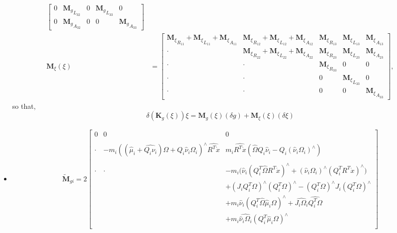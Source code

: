 \documentclass[10pt]{article}
\begin{document}
\begin{itemize}
\begin{align*}
\begin{bmatrix}
	0 & {\mathbf{M}_g}_{L_{32}} & 0 & {\mathbf{M}_g}_{L_{33}} & 0 \\
	0 & {\mathbf{M}_g}_{A_{32}} & 0 & 0 & {\mathbf{M}_g}_{A_{33}}
	\end{bmatrix}
	\\
	{\mathbf{M}_\xi}(\xi) &= \begin{bmatrix}
	{\mathbf{M}_\xi}_{R_{11}} + {\mathbf{M}_\xi}_{L_{11}} + {\mathbf{M}_\xi}_{A_{11}}
	& {\mathbf{M}_\xi}_{R_{12 }} + {\mathbf{M}_\xi}_{L_{12}} + {\mathbf{M}_\xi}_{A_{12}}
	& {\mathbf{M}_\xi}_{R_{13 }}
	& {\mathbf{M}_\xi}_{L_{13}} 
	& {\mathbf{M}_\xi}_{A_{13}} \\
	\cdot & {\mathbf{M}_\xi}_{R_{22}} + {\mathbf{M}_\xi}_{L_{22}} + {\mathbf{M}_\xi}_{A_{22}}
	& {\mathbf{M}_\xi}_{R_{23}} 
	& {\mathbf{M}_\xi}_{L_{23}} 
	& {\mathbf{M}_\xi}_{A_{23}} \\
	\cdot & \cdot &  {\mathbf{M}_\xi}_{R_{33}}
	& 0 & 0 \\
	\cdot & \cdot & 0
	& {\mathbf{M}_\xi}_{L_{33}} & 0 \\
	\cdot & \cdot & 0 & 0 & {\mathbf{M}_\xi}_{A_{33}}
	\end{bmatrix},
	\end{align*}
	so that,
	\begin{equation*}
	\delta (\mathbf{K}_g(\xi)) \xi = \mathbf{M}_g(\xi) (\delta g) + \mathbf{M}_\xi (\xi) (\delta \xi)
	\end{equation*}
	\item \begin{align*}
	\tilde{\mathbf{M}}_{gi} = 2 \begin{bmatrix}
	0 & 0 & 0 \\\\
	\cdot & -m_i ((\hat\mu_i+\widehat{Q_i\nu_i})\Omega + Q_i\hat\nu_i\Omega_i)^\wedge \widehat{R^T\dot{x}} & m_i \widehat{R^T\dot{x}} (\hat{\Omega} Q_i \hat{\nu}_i - Q_i(\hat{\nu}_i\Omega_i)^\wedge) \\\\
	\cdot & \cdot & -m_i \bigl( \hat\nu_i (Q_i^T \hat{\Omega} R^T \dot{x})^\wedge + (\hat{\nu}_i\Omega_i)^\wedge (Q_i^T R^T \dot{x})^\wedge \bigr) \\
	& & + (J_i Q_i^T \Omega)^\wedge (Q_i^T \Omega)^\wedge -(Q_i^T \Omega)^\wedge J_i (Q_i^T \Omega)^\wedge \\
	& & + m_i \hat\nu_i(Q_i^T \hat{\Omega}\hat\mu_i\Omega)^\wedge + \widehat{J_i \Omega_i}\widehat{Q_i^T \Omega} \\
	& & + m_i \widehat{\hat{\nu}_i\Omega_i} (Q_i^T \hat\mu_i \Omega)^\wedge \\

\end{bmatrix}
\end{align*}
\end{itemize}
\end{document}
